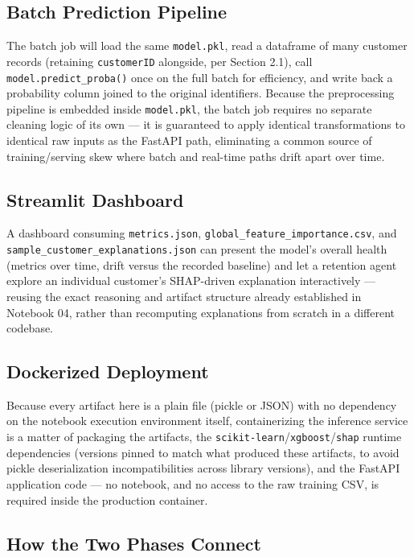 \documentclass[11pt]{article}
\newcommand{\artifact}[1]{\texttt{\color{navy}#1}}
\begin{document}
\subsection{Batch Prediction Pipeline}

The batch job will load the same \artifact{model.pkl}, read a dataframe of many customer records (retaining \artifact{customerID} alongside, per Section 2.1), call \texttt{model.predict\_proba()} once on the full batch for efficiency, and write back a probability column joined to the original identifiers. Because the preprocessing pipeline is embedded inside \artifact{model.pkl}, the batch job requires no separate cleaning logic of its own --- it is guaranteed to apply identical transformations to identical raw inputs as the FastAPI path, eliminating a common source of training/serving skew where batch and real-time paths drift apart over time.

\subsection{Streamlit Dashboard}

A dashboard consuming \artifact{metrics.json}, \artifact{global\_feature\_importance.csv}, and \artifact{sample\_customer\_explanations.json} can present the model's overall health (metrics over time, drift versus the recorded baseline) and let a retention agent explore an individual customer's SHAP-driven explanation interactively --- reusing the exact reasoning and artifact structure already established in Notebook 04, rather than recomputing explanations from scratch in a different codebase.

\subsection{Dockerized Deployment}

Because every artifact here is a plain file (pickle or JSON) with no dependency on the notebook execution environment itself, containerizing the inference service is a matter of packaging the artifacts, the \texttt{scikit-learn}/\texttt{xgboost}/\texttt{shap} runtime dependencies (versions pinned to match what produced these artifacts, to avoid pickle deserialization incompatibilities across library versions), and the FastAPI application code --- no notebook, and no access to the raw training CSV, is required inside the production container.

\subsection{How the Two Phases Connect}
\end{document}
